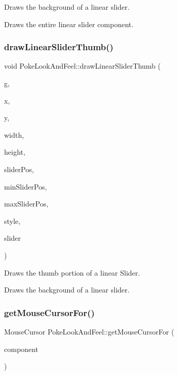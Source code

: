 Draws the background of a linear slider.

Draws the entire linear slider component. \mbox{\label{classPokeLookAndFeel_adca1055b2300612bfcdd53916c50dcef}} 
\subsubsection{\texorpdfstring{draw\+Linear\+Slider\+Thumb()}{drawLinearSliderThumb()}}
{\footnotesize\ttfamily void Poke\+Look\+And\+Feel\+::draw\+Linear\+Slider\+Thumb (\begin{DoxyParamCaption}\item[{Graphics \&}]{g,  }\item[{int}]{x,  }\item[{int}]{y,  }\item[{int}]{width,  }\item[{int}]{height,  }\item[{float}]{slider\+Pos,  }\item[{float}]{min\+Slider\+Pos,  }\item[{float}]{max\+Slider\+Pos,  }\item[{const Slider\+::\+Slider\+Style}]{style,  }\item[{Slider \&}]{slider }\end{DoxyParamCaption})\hspace{0.3cm}{\ttfamily [override]}}

Draws the thumb portion of a linear Slider.

Draws the background of a linear slider. \mbox{\label{classPokeLookAndFeel_adbc8e4289093360ca2f7f706039d2ac5}} 
\subsubsection{\texorpdfstring{get\+Mouse\+Cursor\+For()}{getMouseCursorFor()}}
{\footnotesize\ttfamily Mouse\+Cursor Poke\+Look\+And\+Feel\+::get\+Mouse\+Cursor\+For (\begin{DoxyParamCaption}\item[{Component \&}]{component }\end{DoxyParamCaption})\hspace{0.3cm}{\ttfamily [override]}}

